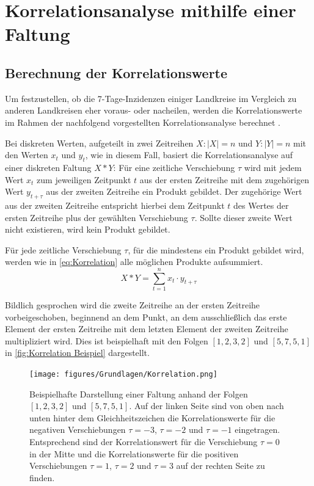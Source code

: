\section{Korrelationsanalyse mithilfe einer Faltung}\label{sec:BeschreibungKorrelationsanalyse}
\subsection{Berechnung der Korrelationswerte}\label{sec:Grundlagen:BerechnungderKorrelationwertes}
Um festzustellen, ob die 7-Tage-Inzidenzen einiger Landkreise im Vergleich zu anderen Landkreisen eher voraus- oder nacheilen, werden die Korrelationswerte im Rahmen der nachfolgend vorgestellten Korrelationsanalyse berechnet \autocite{Korrelation}.

Bei diskreten Werten, aufgeteilt in zwei Zeitreihen $X:|X|=n$ und $Y:|Y|=n$ mit den Werten $x_t$ und $y_t$, wie in diesem Fall, basiert die Korrelationsanalyse auf einer diskreten Faltung $X\ast Y$:
Für eine zeitliche Verschiebung $\tau$ wird mit jedem Wert $x_t$ zum jeweiligen Zeitpunkt $t$ aus der ersten Zeitreihe mit dem zugehörigen Wert $y_{t+\tau}$ aus der zweiten Zeitreihe ein Produkt gebildet. Der zugehörige Wert aus der zweiten Zeitreihe entspricht hierbei dem Zeitpunkt $t$ des Wertes der ersten Zeitreihe plus der gewählten Verschiebung $\tau$. Sollte dieser zweite Wert nicht existieren, wird kein Produkt gebildet.

Für jede zeitliche Verschiebung $\tau$, für die mindestens ein Produkt gebildet wird, werden wie in \autoref{eq:Korrelation} alle möglichen Produkte aufsummiert.
\begin{equation}\label{eq:Korrelation}
    X\ast Y = \sum_{t=1}^n x_t\cdot y_{t+\tau}
\end{equation}


Bildlich gesprochen wird die zweite Zeitreihe an der ersten Zeitreihe vorbeigeschoben, beginnend an dem Punkt, an dem ausschließlich das erste Element der ersten Zeitreihe mit dem letzten Element der zweiten Zeitreihe multipliziert wird. Dies ist beispielhaft mit den Folgen $[1,2,3,2]$ und $[5,7,5,1]$ in \autoref{fig:Korrelation Beispiel} dargestellt.

\begin{figure}[H]
    \centering
    \texttt{[image: figures/Grundlagen/Korrelation.png]}
    \caption{Beispielhafte Darstellung einer Faltung anhand der Folgen $[1,2,3,2]$ und $[5,7,5,1]$. Auf der linken Seite sind von oben nach unten hinter dem Gleichheitszeichen die Korrelationswerte für die negativen Verschiebungen $\tau=-3$, $\tau=-2$ und $\tau=-1$ eingetragen. Entsprechend sind der Korrelationswert für die Verschiebung $\tau=0$ in der Mitte und die Korrelationswerte für die positiven Verschiebungen $\tau=1$, $\tau=2$ und $\tau=3$ auf der rechten Seite zu finden.}
    \label{fig:Korrelation Beispiel}
\end{figure}

